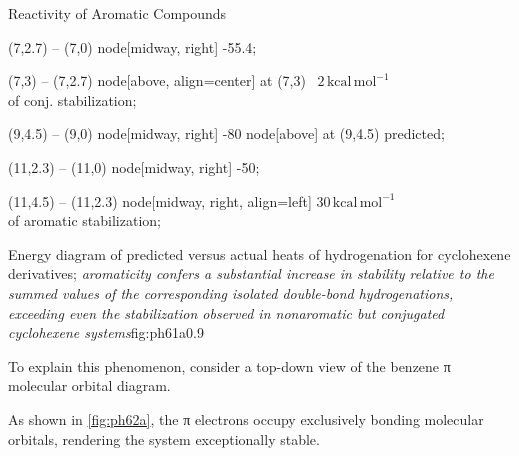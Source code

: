 \begin{core}{Reactivity of Aromatic Compounds}
{        %
         (7,2.7) -- (7,0) node[midway, right] {-55.4};

         (7,3) -- (7,2.7) node[above, align=center] at (7,3) {\footnotesize ~$2\,\text{kcal}\,\text{mol}^{-1}$ \\\footnotesize of conj. stabilization};

         (9,4.5) -- (9,0) node[midway, right] {-80} node[above] at (9,4.5) {\footnotesize predicted};

         (11,2.3) -- (11,0) node[midway, right] {-50};

         (11,4.5) -- (11,2.3) node[midway, right, align=left] {\footnotesize $30\,\text{kcal}\,\text{mol}^{-1}$\\\footnotesize of aromatic stabilization};
      }{Energy diagram of predicted versus actual heats of hydrogenation for cyclohexene derivatives; \textit{aromaticity confers a substantial increase in stability relative to the summed values of the corresponding isolated double-bond hydrogenations, exceeding even the stabilization observed in nonaromatic but conjugated cyclohexene systems}}{fig:ph61a}{0.9}
      \vspace{-0.4cm}

      To explain this phenomenon, consider a top-down view of the benzene π molecular orbital diagram.


      As shown in \autoref{fig:ph62a}, the π electrons occupy exclusively bonding molecular orbitals, rendering the system exceptionally stable.

    \end{core}


